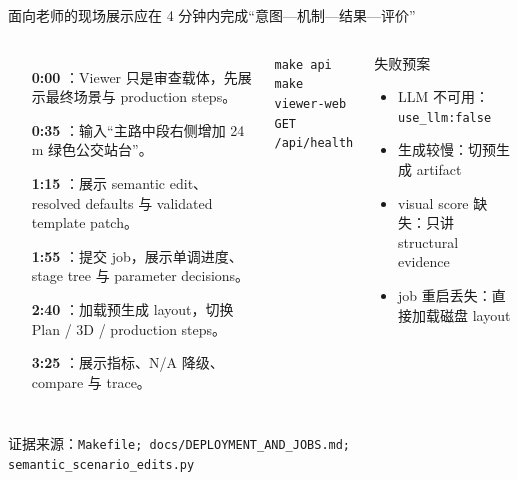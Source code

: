 \documentclass[aspectratio=169,10pt]{ctexbeamer}
\newcommand{\sourcefoot}[1]{\vfill{\scriptsize\color{hkustgrey}证据来源：\texttt{#1}}}
\begin{document}
\begin{frame}{面向老师的现场展示应在 4 分钟内完成“意图—机制—结果—评价”}
  \begin{columns}[T,onlytextwidth]
      \begin{enumerate}
        \item[\textbf{0:00}] ：Viewer 只是审查载体，先展示最终场景与 production steps。
        \item[\textbf{0:35}] ：输入“主路中段右侧增加 24 m 绿色公交站台”。
        \item[\textbf{1:15}] ：展示 semantic edit、resolved defaults 与 validated template patch。
        \item[\textbf{1:55}] ：提交 job，展示单调进度、stage tree 与 parameter decisions。
        \item[\textbf{2:40}] ：加载预生成 layout，切换 Plan / 3D / production steps。
        \item[\textbf{3:25}] ：展示指标、N/A 降级、compare 与 trace。
      \end{enumerate}
      \begin{callout}[现场预热]
        \texttt{make api}\\
        \texttt{make viewer-web}\\
        \texttt{GET /api/health}
      \end{callout}
      \tightgap
      \begin{exampleblock}{失败预案}
        \begin{itemize}
          \item LLM 不可用：\texttt{use\_llm:false}
          \item 生成较慢：切预生成 artifact
          \item visual score 缺失：只讲 structural evidence
          \item job 重启丢失：直接加载磁盘 layout
        \end{itemize}
      \end{exampleblock}
  \end{columns}
  \sourcefoot{Makefile; docs/DEPLOYMENT\_AND\_JOBS.md; semantic\_scenario\_edits.py}
\end{frame}
\end{document}
